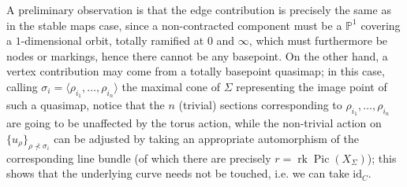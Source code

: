 \documentclass[11pt]{amsart}
\newcommand{\PP}{\mathbb P}
\newcommand{\Pic}{\operatorname{Pic}}
\newcommand{\rk}{\operatorname{rk}}
\newcommand{\id}{\mathrm{id}}
\theoremstyle{definition}
\theoremstyle{definition}
\begin{document}
A preliminary observation is that the edge contribution is precisely the same as in the stable maps case, since a non-contracted component must be a $\PP^1$ covering a $1$-dimensional orbit, totally ramified at $0$ and $\infty$, which must furthermore be nodes or markings, hence there cannot be any basepoint. On the other hand, a vertex contribution may come from a totally basepoint quasimap; in this case, calling $\sigma_i=\langle \rho_{i_1},\ldots,\rho_{i_n}\rangle$ the maximal cone of $\Sigma$ representing the image point of such a quasimap, notice that the $n$ (trivial) sections corresponding to $\rho_{i_1},\ldots,\rho_{i_n}$ are going to be unaffected by the torus action, while the non-trivial action on $\{u_\rho\}_{\rho\nprec\sigma_i}$ can be adjusted by taking an appropriate automorphism of the corresponding line bundle (of which there are precisely $r=\rk\Pic(X_\Sigma)$); this shows that the underlying curve needs not be touched, i.e. we can take $\id_C$.
\end{document}
